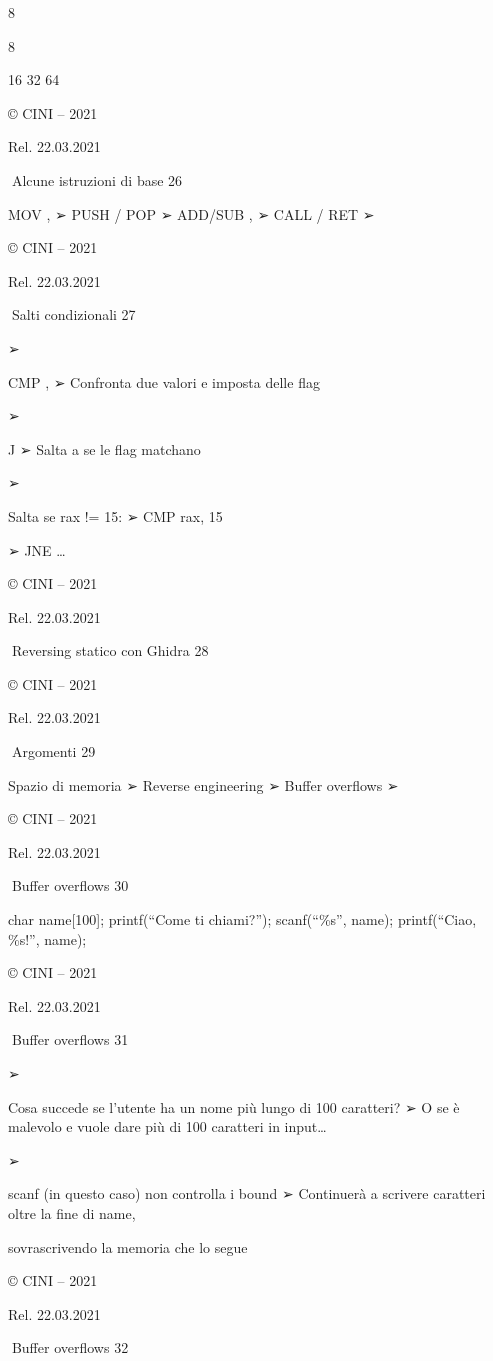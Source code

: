 \documentclass[11pt,a4paper]{article}
\begin{document}
8

8

16 32 64

© CINI -- 2021

Rel. 22.03.2021

Alcune istruzioni di base 26

MOV , ➢ PUSH / POP ➢ ADD/SUB , ➢ CALL / RET ➢

© CINI -- 2021

Rel. 22.03.2021

Salti condizionali 27

➢

CMP , ➢ Confronta due valori e imposta delle flag

➢

J ➢ Salta a se le flag matchano

➢

Salta se rax != 15: ➢ CMP rax, 15

➢ JNE \ldots{}

© CINI -- 2021

Rel. 22.03.2021

Reversing statico con Ghidra 28

© CINI -- 2021

Rel. 22.03.2021

Argomenti 29

Spazio di memoria ➢ Reverse engineering ➢ Buffer overflows ➢

© CINI -- 2021

Rel. 22.03.2021

Buffer overflows 30

char name{[}100{]}; printf(``Come ti chiami?''); scanf(``\%s'', name);
printf(``Ciao, \%s!\n'', name);

© CINI -- 2021

Rel. 22.03.2021

Buffer overflows 31

➢

Cosa succede se l'utente ha un nome più lungo di 100 caratteri? ➢ O se è
malevolo e vuole dare più di 100 caratteri in input\ldots{}

➢

scanf (in questo caso) non controlla i bound ➢ Continuerà a scrivere
caratteri oltre la fine di name,

sovrascrivendo la memoria che lo segue

© CINI -- 2021

Rel. 22.03.2021

Buffer overflows 32
\end{document}
